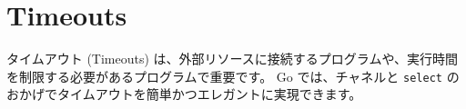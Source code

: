 \section{Timeouts}

タイムアウト (Timeouts) は、外部リソースに接続するプログラムや、実行時間を制限する必要があるプログラムで重要です。 Go では、チャネルと \texttt{select} のおかげでタイムアウトを簡単かつエレガントに実現できます。




